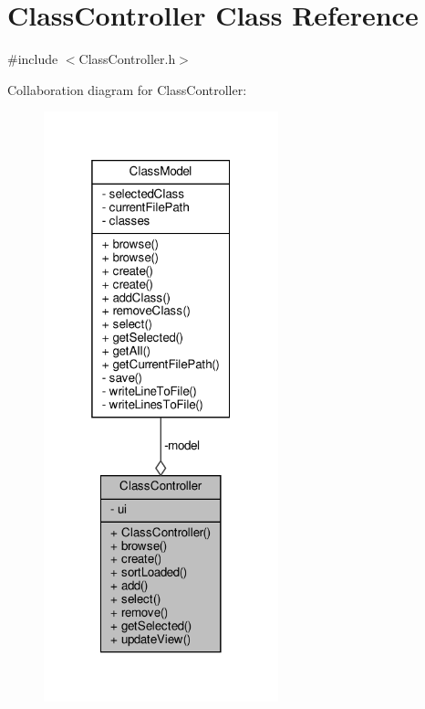 \hypertarget{classClassController}{}\section{Class\+Controller Class Reference}
\label{classClassController}


{\ttfamily \#include $<$Class\+Controller.\+h$>$}



Collaboration diagram for Class\+Controller\+:
\nopagebreak
\begin{figure}[H]
\begin{center}
\leavevmode
\includegraphics[width=193pt]{classClassController__coll__graph}
\end{center}
\end{figure}

